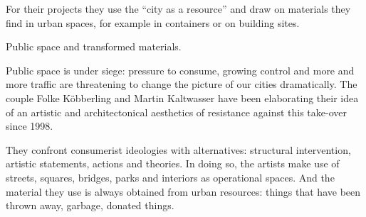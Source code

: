 \begin{itemize}
For their projects they use the “city as a resource” and draw on materials they find in urban spaces, for example in containers or on building sites.

Public space and transformed materials. 

Public space is under siege: pressure to consume, growing control and more and more traffic are threatening to change the picture of our cities dramatically. The couple Folke Köbberling and Martin Kaltwasser have been elaborating their idea of an artistic and architectonical aesthetics of resistance against this take-over since 1998.

They confront consumerist ideologies with alternatives: structural intervention, artistic statements, actions and theories. In doing so, the artists make use of streets, squares, bridges, parks and interiors as operational spaces. And the material they use is always obtained from urban resources: things that have been thrown away, garbage, donated things.


\end{itemize}


